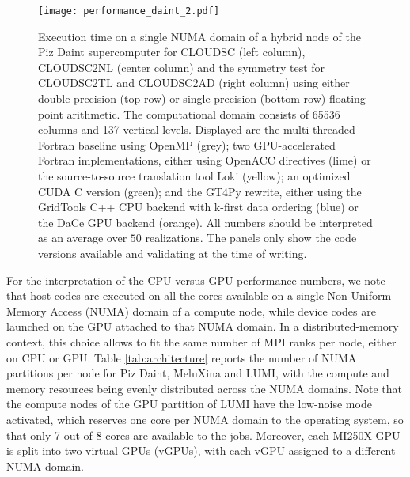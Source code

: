 \documentclass[main.tex]{subfiles}
\begin{document}
        \begin{figure}[t!]
            \centering
            \texttt{[image: performance\_daint\_2.pdf]}
            \caption{Execution time on a single NUMA domain of a hybrid node of the Piz Daint supercomputer for CLOUDSC (left column), CLOUDSC2NL (center column) and the symmetry test for CLOUDSC2TL and CLOUDSC2AD (right column) using either double precision (top row) or single precision (bottom row) floating point arithmetic. The computational domain consists of 65536 columns and 137 vertical levels. Displayed are the multi-threaded Fortran baseline using OpenMP (grey); two GPU-accelerated Fortran implementations, either using OpenACC directives (lime) or the source-to-source translation tool Loki (yellow); an optimized CUDA C version (green); and the GT4Py rewrite, either using the GridTools C++ CPU backend with k-first data ordering (blue) or the DaCe GPU backend (orange). All numbers should be interpreted as an average over $50$ realizations. The panels only show the code versions available and validating at the time of writing.}
            \label{fig:performance-daint}
        \end{figure}
        
        \noindent For the interpretation of the CPU versus GPU performance numbers, we note that host codes are executed on all the cores available on a single Non-Uniform Memory Access (NUMA) domain of a compute node, while device codes are launched on the GPU attached to that NUMA domain. In a distributed-memory context, this choice allows to fit the same number of MPI ranks per node, either on CPU or GPU. Table \ref{tab:architecture} reports the number of NUMA partitions per node for Piz Daint, MeluXina and LUMI, with the compute and memory resources being evenly distributed across the NUMA domains. Note that the compute nodes of the GPU partition of LUMI have the low-noise mode activated, which reserves one core per NUMA domain to the operating system, so that only 7 out of 8 cores are available to the jobs. Moreover, each MI250X GPU is split into two virtual GPUs (vGPUs), with each vGPU assigned to a different NUMA domain. 
        
\end{document}
